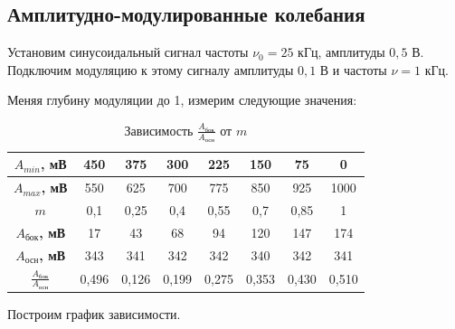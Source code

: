 \documentclass[a4paper, 12pt]{article}%
\begin{document}
\subsection{Амплитудно-модулированные колебания}

Установим синусоидальный сигнал частоты $\nu_0 = 25$ кГц, амплитуды $0,5$ В. Подключим модуляцию к этому сигналу амплитуды $0,1$ В и частоты $\nu = 1$ кГц.

Меняя глубину модуляции до 1, измерим следующие значения:

\begin{table}[h!]
    \centering
    \begin{tabular}{|c|c|c|c|c|c|c|c|}
        \hline
        \textbf{$A_{min}$, мВ}                           & 450   & 375   & 300   & 225   & 150   & 75    & 0     \\ \hline
        \textbf{$A_{max}$, мВ}                           & 550   & 625   & 700   & 775   & 850   & 925   & 1000  \\ \hline
        \textbf{$m$}                                     & 0,1   & 0,25  & 0,4   & 0,55  & 0,7   & 0,85  & 1     \\ \hline
        \textbf{$A_{\text{бок}}$, мВ}                    & 17    & 43    & 68    & 94    & 120   & 147   & 174   \\ \hline
        \textbf{$A_{\text{осн}}$, мВ}                    & 343   & 341   & 342   & 342   & 340   & 342   & 341   \\ \hline
        \textbf{$\frac{A_{\text{бок}}}{A_{\text{осн}}}$} & 0,496 & 0,126 & 0,199 & 0,275 & 0,353 & 0,430 & 0,510 \\ \hline
    \end{tabular}
    \caption{Зависимость $\frac{A_{\text{бок}}}{A_{\text{осн}}}$ от $m$}
\end{table}

Построим график зависимости.
\end{document}
